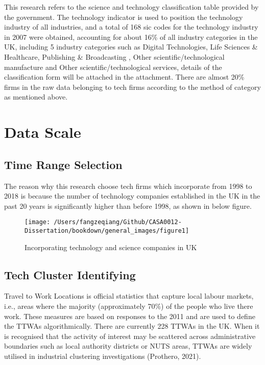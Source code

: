 \documentclass[
  12pt,
  oneside]{book}
\begin{document}
This research refers to the science and technology classification table provided by the government. The technology indicator is used to position the technology industry of all industries, and a total of 168 sic codes for the technology industry in 2007 were obtained, accounting for about 16\% of all industry categories in the UK, including 5 industry categories such as Digital Technologies, Life Sciences \& Healthcare, Publishing \& Broadcasting , Other scientific/technological manufacture and Other scientific/technological services, details of the classification form will be attached in the attachment. There are almost 20\% firms in the raw data belonging to tech firms according to the method of category as mentioned above.

\hypertarget{data-scale}{%
\section{Data Scale}\label{data-scale}}

\hypertarget{time-range-selection}{%
\subsection{Time Range Selection}\label{time-range-selection}}

The reason why this research choose tech firms which incorporate from 1998 to 2018 is because the number of technology companies established in the UK in the past 20 years is significantly higher than before 1998, as shown in below figure.

\begin{figure}
\texttt{[image: /Users/fangzeqiang/Github/CASA0012-Dissertation/bookdown/general\_images/figure1]} \caption{Incorporating technology and science companies in UK}\label{fig:fig-1}
\end{figure}

\hypertarget{tech-cluster-identifying}{%
\subsection{Tech Cluster Identifying}\label{tech-cluster-identifying}}

Travel to Work Locations is official statistics that capture local labour markets, i.e., areas where the majority (approximately 70\%) of the people who live there work. These measures are based on responses to the 2011 and are used to define the TTWAs algorithmically. There are currently 228 TTWAs in the UK. When it is recognised that the activity of interest may be scattered across administrative boundaries such as local authority districts or NUTS areas, TTWAs are widely utilised in industrial clustering investigations (Prothero, 2021).
\end{document}
